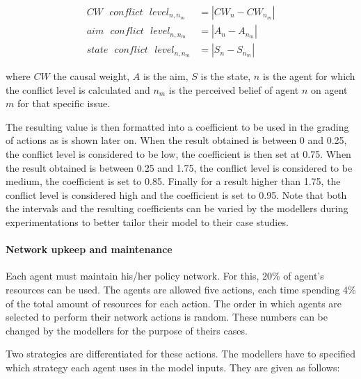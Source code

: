 \begin{enumerate}
\begin{equation}\begin{split}
CW \text{ }conflict \text{ } level_{n,n_m} &= |CW_n - CW_{n_m}| \\
aim \text{ } conflict \text{ } level_{n,n_m} &= |A_n - A_{n_m}| \\
state \text{ }conflict \text{ } level_{n,n_m} &= |S_n - S_{n_m}|
\end{split}\end{equation}

where $CW$ the causal weight, $A$ is the aim, $S$ is the state, $n$ is the agent for which the conflict level is calculated and $n_m$ is the perceived belief of agent $n$ on agent $m$ for that specific issue.

The resulting value is then formatted into a coefficient to be used in the grading of actions as is shown later on. When the result obtained is between 0 and 0.25, the conflict level is considered to be low, the coefficient is then set at 0.75. When the result obtained is between 0.25 and 1.75, the conflict level is considered to be medium, the coefficient is set to 0.85. Finally for a result higher than 1.75, the conflict level is considered high and the coefficient is set to 0.95. Note that both the intervals and the resulting coefficients can be varied by the modellers during experimentations to better tailor their model to their case studies.

\end{enumerate}

\paragraph{Network upkeep and maintenance}

Each agent must maintain his/her policy network. For this, 20\% of agent’s resources can be used. The agents are allowed five actions, each time spending 4\% of the total amount of resources for each action. The order in which agents are selected to perform their network actions is random. These numbers can be changed by the modellers for the purpose of theirs cases.

Two strategies are differentiated for these actions. The modellers have to specified which strategy each agent uses in the model inputs. They are given as follows:

